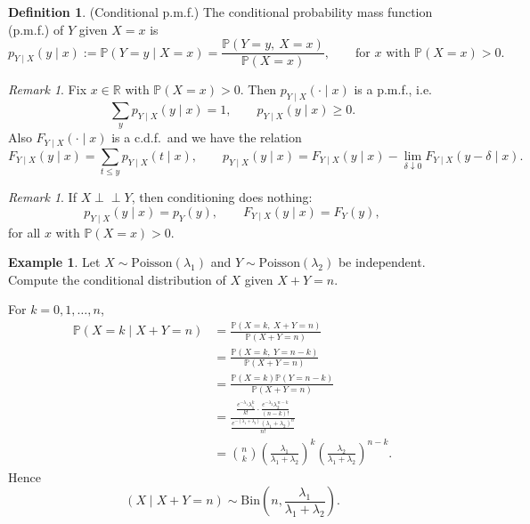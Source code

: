 \documentclass[11pt]{article}
\theoremstyle{plain}
\theoremstyle{definition}
\newtheorem{definition}[theorem]{Definition}
\newtheorem{example}[theorem]{Example}
\theoremstyle{remark}
\newtheorem{remark}[theorem]{Remark}
\newcommand{\R}{\mathbb{R}}
\begin{document}
	\begin{definition}
		(Conditional p.m.f.)
		The conditional probability mass function (p.m.f.) of \(Y\) given \(X=x\) is
		\[
		p_{Y\mid X}(y\mid x):=\mathbb{P}(Y=y\mid X=x)
		=\frac{\mathbb{P}(Y=y,\ X=x)}{\mathbb{P}(X=x)},
		\qquad \text{for \(x\) with \(\mathbb{P}(X=x)>0\).}
		\]
	\end{definition}
	
	\begin{remark}
		Fix \(x\in\R\) with \(\mathbb{P}(X=x)>0\).
		Then \(p_{Y\mid X}(\cdot\mid x)\) is a p.m.f., i.e.
		\[
		\sum_{y} p_{Y\mid X}(y\mid x)=1,
		\qquad
		p_{Y\mid X}(y\mid x)\ge 0.
		\]
		Also \(F_{Y\mid X}(\cdot\mid x)\) is a c.d.f.\ and we have the relation
		\[
		F_{Y\mid X}(y\mid x)=\sum_{t\le y} p_{Y\mid X}(t\mid x),
		\qquad
		p_{Y\mid X}(y\mid x)=F_{Y\mid X}(y\mid x)-\lim_{\delta\downarrow 0}F_{Y\mid X}(y-\delta\mid x).
		\]
	\end{remark}
	
	\begin{remark}
		If \(X\perp\!\!\!\perp Y\), then conditioning does nothing:
		\[
		p_{Y\mid X}(y\mid x)=p_Y(y),
		\qquad
		F_{Y\mid X}(y\mid x)=F_Y(y),
		\]
		for all \(x\) with \(\mathbb{P}(X=x)>0\).
	\end{remark}
	
	
	
	\begin{example}
		Let \(X\sim \mathrm{Poisson}(\lambda_1)\) and \(Y\sim \mathrm{Poisson}(\lambda_2)\) be independent.
		Compute the conditional distribution of \(X\) given \(X+Y=n\).
		
		For \(k=0,1,\dots,n\),
		\begin{align*}
			\mathbb{P}(X=k\mid X+Y=n)
			&=\frac{\mathbb{P}(X=k,\ X+Y=n)}{\mathbb{P}(X+Y=n)}\\
			&=\frac{\mathbb{P}(X=k,\ Y=n-k)}{\mathbb{P}(X+Y=n)}\\
			&=\frac{\mathbb{P}(X=k)\mathbb{P}(Y=n-k)}{\mathbb{P}(X+Y=n)}\\
			&=\frac{\frac{e^{-\lambda_1}\lambda_1^{k}}{k!}\cdot \frac{e^{-\lambda_2}\lambda_2^{\,n-k}}{(n-k)!}}
			{\frac{e^{-(\lambda_1+\lambda_2)}(\lambda_1+\lambda_2)^{n}}{n!}}\\
			&=\binom{n}{k}\left(\frac{\lambda_1}{\lambda_1+\lambda_2}\right)^{k}
			\left(\frac{\lambda_2}{\lambda_1+\lambda_2}\right)^{n-k}.
		\end{align*}
		Hence
		\[
		(X\mid X+Y=n)\sim \mathrm{Bin}\!\left(n,\frac{\lambda_1}{\lambda_1+\lambda_2}\right).
		\]
	\end{example}
	
\end{document}
